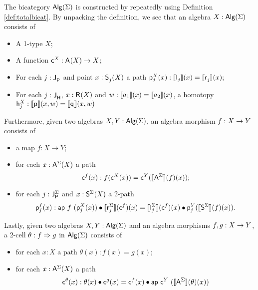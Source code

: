 The bicategory $\algM(\sign)$ is constructed by repeatedly using Definition \ref{def:totalbicat}.
By unpacking the definition, we see that an algebra $X : \algM(\sign)$ consists of
\begin{itemize}
	\item A 1-type $X$;
	\item A function $\AlgPoint{X} : \polyAct{\pointconstr}{X} \rightarrow X$;
	\item For each $j : \pathlabel$ and point $x : \polyAct{\patharg_j}{X}$ a path
	$
	\AlgPath{X}{j}(x) : \semE{\pathleft_j}(x) = \semE{\pathright_j}(x);
	$
	\item For each $j : \homotlabel$, $x : \polyAct{\homotpointarg}{X}$ and $w : \semE{a_1}(x) = \semE{a_2}(x)$, a homotopy
	$
	\AlgHomot{X}{j} : \semH{\homotleft}(x, w) = \semH{\homotright}(x, w)
	$
\end{itemize}
Furthermore, given two algebras  $X, Y : \algM(\sign)$, an algebra morphism $f : X \onecell Y$ consists of
\begin{itemize}
	\item a map $f : X \rightarrow Y$;
	\item for each $x : \polyAct{\pointconstr[\sign]}{X}$ a path
	\[
	\AlgMapPoint{f}(x) : f(\AlgPoint{X}(x)) = \AlgPoint{Y}(\semP{\pointconstr[\sign]}(f)(x));
	\]
	\item for each $j : \pathlabel[\sign]$ and $x : \polyAct{\patharg[\sign]}{X}$ a 2-path
	\[
	\AlgMapPath{f}{j}(x) :
	\ap{f}{(\AlgPath{X}{j}(x))} \vcomp \semE{\pathright[\sign]_j}(\AlgMapPoint{f})(x)
	=
	\semE{\pathleft[\sign]_j}(\AlgMapPoint{f})(x) \vcomp \AlgPath{Y}{j}(\semP{\patharg[\sign]}(f)(x)).
	\]
\end{itemize}
Lastly, given two algebras $X, Y : \algM(\sign)$ and an algebra morphisms $f, g : X \onecell Y$, a 2-cell $\theta : f \twocell g$ in $\algM(\sign)$ consists of
\begin{itemize}
	\item for each $x : X$ a path $\theta(x) : f(x) = g(x)$;
	\item for each $x : \polyAct{\pointconstr[\sign]}{X}$ a path
	\[
	\AlgCellPoint{\theta}(x) : 
	\theta(x) \vcomp \AlgMapPoint{g}(x)
	=
	\AlgMapPoint{f}(x)
	\vcomp
	\ap{\AlgPoint{Y}}{(\semP{\pointconstr[\sign]}(\theta)(x))}
	\]
\end{itemize}
